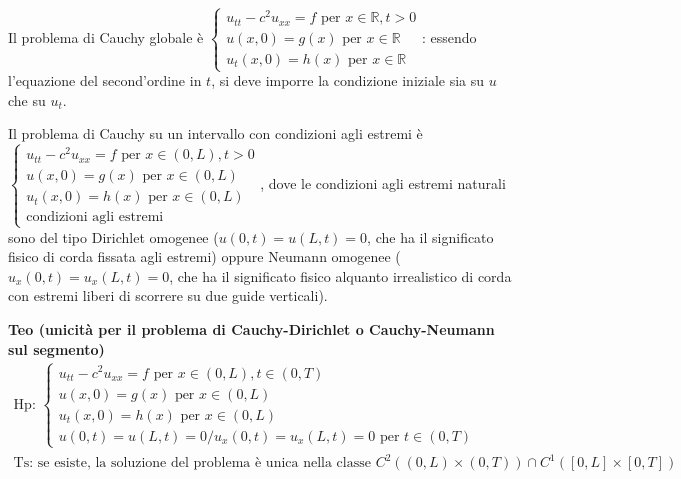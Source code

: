 \documentclass{article}
\begin{document}
Il problema di Cauchy globale \`{e} $\left\{ 
\begin{array}{c}
u_{tt}-c^{2}u_{xx}=f\text{ per }x\in 
\mathbb{R}
,t>0 \\ 
u\left( x,0\right) =g\left( x\right) \text{ per }x\in 
\mathbb{R}
\\ 
u_{t}\left( x,0\right) =h\left( x\right) \text{ per }x\in 
\mathbb{R}%
\end{array}%
\right. $: essendo l'equazione del second'ordine in $t$, si deve imporre la
condizione iniziale sia su $u$ che su $u_{t}$.

Il problema di Cauchy su un intervallo con condizioni agli estremi \`{e} $%
\left\{ 
\begin{array}{c}
u_{tt}-c^{2}u_{xx}=f\text{ per }x\in \left( 0,L\right) ,t>0 \\ 
u\left( x,0\right) =g\left( x\right) \text{ per }x\in \left( 0,L\right) \\ 
u_{t}\left( x,0\right) =h\left( x\right) \text{ per }x\in \left( 0,L\right)
\\ 
\text{condizioni agli estremi}%
\end{array}%
\right. $, dove le condizioni agli estremi naturali sono del tipo Dirichlet
omogenee ($u\left( 0,t\right) =u\left( L,t\right) =0$, che ha il significato
fisico di corda fissata agli estremi) oppure Neumann omogenee ($u_{x}\left(
0,t\right) =u_{x}\left( L,t\right) =0$, che ha il significato fisico
alquanto irrealistico di corda con estremi liberi di scorrere su due guide
verticali).

\textbf{Teo (unicit\`{a} per il problema di Cauchy-Dirichlet o
Cauchy-Neumann sul segmento)}%
\begin{gather*}
\text{Hp: }\left\{ 
\begin{array}{c}
u_{tt}-c^{2}u_{xx}=f\text{ per }x\in \left( 0,L\right) ,t\in \left(
0,T\right) \\ 
u\left( x,0\right) =g\left( x\right) \text{ per }x\in \left( 0,L\right) \\ 
u_{t}\left( x,0\right) =h\left( x\right) \text{ per }x\in \left( 0,L\right)
\\ 
u\left( 0,t\right) =u\left( L,t\right) =0/u_{x}\left( 0,t\right)
=u_{x}\left( L,t\right) =0\text{ per }t\in \left( 0,T\right)%
\end{array}%
\right. \\
\text{Ts: se esiste, la soluzione del problema \`{e} unica nella classe }%
C^{2}\left( \left( 0,L\right) \times \left( 0,T\right) \right) \cap
C^{1}\left( \left[ 0,L\right] \times \left[ 0,T\right] \right) \text{ }
\end{gather*}
\end{document}
